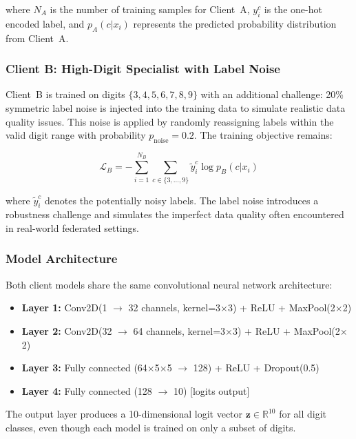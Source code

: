 where $N_A$ is the number of training samples for Client~A, $y_i^c$ is the one-hot encoded label, and $p_A(c | x_i)$ represents the predicted probability distribution from Client~A.

\subsubsection{Client B: High-Digit Specialist with Label Noise}

Client~B is trained on digits $\{3, 4, 5, 6, 7, 8, 9\}$ with an additional challenge: 20\% symmetric label noise is injected into the training data to simulate realistic data quality issues. This noise is applied by randomly reassigning labels within the valid digit range with probability $p_{\text{noise}} = 0.2$. The training objective remains:

\begin{equation}
\mathcal{L}_B = -\sum_{i=1}^{N_B} \sum_{c \in \{3,\ldots,9\}} \tilde{y}_i^c \log p_B(c | x_i)
\end{equation}

where $\tilde{y}_i^c$ denotes the potentially noisy labels. The label noise introduces a robustness challenge and simulates the imperfect data quality often encountered in real-world federated settings.

\subsubsection{Model Architecture}

Both client models share the same convolutional neural network architecture:

\begin{itemize}
    \item \textbf{Layer 1:} Conv2D(1 $\rightarrow$ 32 channels, kernel=3$\times$3) + ReLU + MaxPool(2$\times$2)
    \item \textbf{Layer 2:} Conv2D(32 $\rightarrow$ 64 channels, kernel=3$\times$3) + ReLU + MaxPool(2$\times$2)
    \item \textbf{Layer 3:} Fully connected (64$\times$5$\times$5 $\rightarrow$ 128) + ReLU + Dropout(0.5)
    \item \textbf{Layer 4:} Fully connected (128 $\rightarrow$ 10) [logits output]
\end{itemize}

The output layer produces a 10-dimensional logit vector $\mathbf{z} \in \mathbb{R}^{10}$ for all digit classes, even though each model is trained on only a subset of digits.

